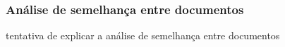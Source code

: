 \subsubsection{Análise de semelhança entre documentos}

tentativa de explicar a análise de semelhança entre documentos